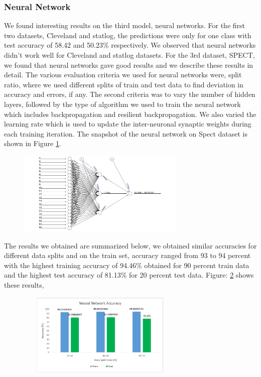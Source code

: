 \documentclass[conference]{IEEEtran}
\begin{document}
\subsubsection{Neural Network}
We found interesting results on the third model, neural networks. For the first two datasets, Cleveland and statlog, the predictions were only for one class with test accuracy of 58.42 and 50.23\% respectively. We observed that neural networks didn’t work well for Cleveland and statlog datasets. For the 3rd dataset, SPECT, we found that neural networks gave good results and we describe these results in detail. 
The various evaluation criteria we used for neural networks were, split ratio, where we used different splits of train and test data to find deviation in accuracy and errors, if any. The second criteria was to vary the number of hidden layers, followed by the type of algorithm we used to train the neural network which includes backpropagation and resilient backpropagation. We also varied the learning rate which is used to update the inter-neuronal synaptic weights during each training iteration. The snapshot of the neural network on Spect dataset is shown in Figure \ref{fig17}.

\begin{figure}
	\centering
	\includegraphics[height=4cm, width=8cm]{images/Fig17}
	\label{fig17}
\end{figure}

The results we obtained are summarized below, we obtained similar accuracies for different data splits and on the train set, accuracy ranged from 93 to 94 percent with the highest training accuracy of 94.46\% obtained for 90 percent train data and the highest test accuracy of 81.13\% for 20 percent test data.  Figure: \ref{fig18} shows these results,\\

\begin{figure}
	\centering
	\includegraphics[height=4cm, width=8cm]{images/Fig18}
	\label{fig18}
\end{figure}
\end{document}
